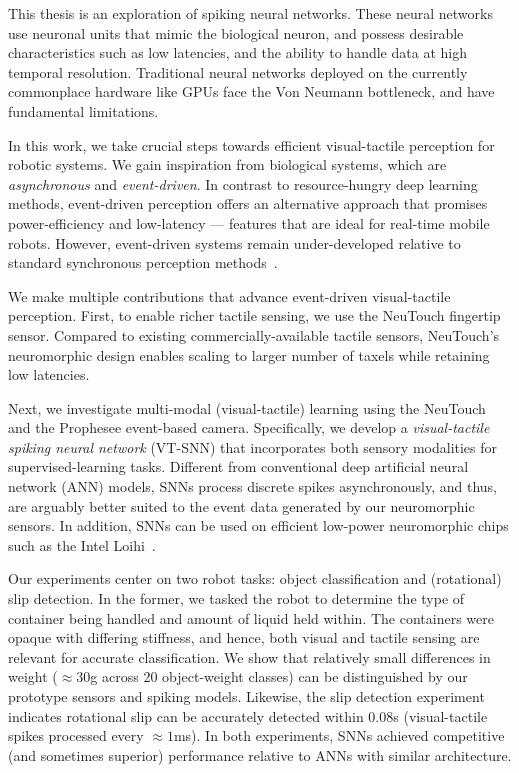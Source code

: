 \documentclass[fyp]{socreport}
\begin{document}
This thesis is an exploration of spiking neural networks. These neural networks
use neuronal units that mimic the biological neuron, and possess desirable
characteristics such as low latencies, and the ability to handle data at high
temporal resolution. Traditional neural networks deployed on the currently
commonplace hardware like GPUs face the Von Neumann bottleneck, and have
fundamental limitations.

In this work, we take crucial steps towards efficient visual-tactile perception
for robotic systems. We gain inspiration from biological systems, which are
\emph{asynchronous} and \emph{event-driven}. In contrast to resource-hungry deep
learning methods, event-driven perception offers an alternative approach that
promises power-efficiency and low-latency --- features that are ideal for
real-time mobile robots. However, event-driven systems remain under-developed
relative to standard synchronous perception methods~\cite{pfeiffer2018deep}.

We make multiple contributions that advance event-driven visual-tactile
perception. First, to enable richer tactile sensing, we use the NeuTouch
fingertip sensor. Compared to existing commercially-available tactile sensors,
NeuTouch's neuromorphic design enables scaling to larger number of taxels while
retaining low latencies.

Next, we investigate multi-modal (visual-tactile) learning using the NeuTouch
and the Prophesee event-based camera. Specifically, we develop a
\emph{visual-tactile spiking neural network} (VT-SNN) that incorporates both
sensory modalities for supervised-learning tasks. Different from conventional
deep artificial neural network (ANN) models, SNNs process discrete spikes
asynchronously, and thus, are arguably better suited to the event data generated
by our neuromorphic sensors. In addition, SNNs can be used on efficient
low-power neuromorphic chips such as the Intel Loihi~\cite{davies2018loihi}.

Our experiments center on two robot tasks: object classification and
(rotational) slip detection. In the former, we tasked the robot to determine the
type of container being handled and amount of liquid held within. The containers
were opaque with differing stiffness, and hence, both visual and tactile sensing
are relevant for accurate classification. We show that relatively small
differences in weight ($\approx 30$g across 20 object-weight classes) can be
distinguished by our prototype sensors and spiking models. Likewise, the slip
detection experiment indicates rotational slip can be accurately detected within
$0.08$s (visual-tactile spikes processed every $\approx 1$ms). In both
experiments, SNNs achieved competitive (and sometimes superior) performance
relative to ANNs with similar architecture.
\end{document}
